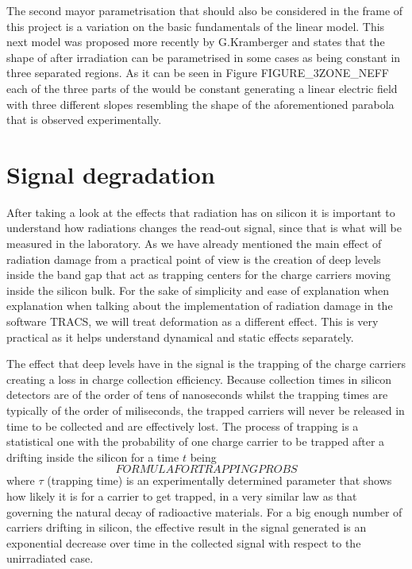 The second mayor parametrisation that should also be considered in the frame of this project is a variation on the basic fundamentals of the linear model. This next model was proposed more recently by G.Kramberger and states that the shape of \neff after irradiation can be parametrised in some cases as being constant in three separated regions. As it can be seen in Figure FIGURE\_3ZONE\_NEFF each of the three parts of the \neff would be constant generating a linear electric field with three different slopes resembling the shape of the aforementioned parabola that is observed experimentally.


\section{Signal degradation} %

After taking a look at the effects that radiation has on silicon it is important to understand how radiations changes the read-out signal, since that is what will be measured in the laboratory. As we have already mentioned the main effect of radiation damage from a practical point of view is the creation of deep levels inside the band gap that act as trapping centers for the charge carriers moving inside the silicon bulk. For the sake of simplicity and ease of explanation when explanation when talking about the implementation of radiation damage in the software TRACS, we will treat \neff deformation as a different effect. This is very practical as it helps understand dynamical and static effects separately. 

The effect that deep levels have in the signal is the trapping of the charge carriers creating a loss in charge collection efficiency. Because collection times in silicon detectors are of the order of tens of nanoseconds whilst the trapping times are typically of the order of miliseconds, the trapped carriers will never be released in time to be collected and are effectively lost. The process of trapping is a statistical one with the probability of one charge carrier to be trapped after a drifting inside the silicon for a time $t$ being  \[FORMULA FOR TRAPPING PROBS\] where $\tau$ (trapping time) is an experimentally determined parameter that shows how likely it is for a carrier to get trapped, in a very similar law as that governing the natural decay of radioactive materials. For a big enough number of carriers drifting in silicon, the effective result in the signal generated is an exponential decrease over time in the collected signal with respect to the unirradiated case. 

